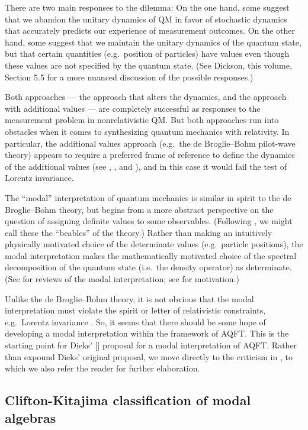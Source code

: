 \documentclass[11pt]{article}
\theoremstyle{definition}
\theoremstyle{definition}
\theoremstyle{remark}
\begin{document}
There are two main responses to the dilemma: On the one hand, some
suggest that we abandon the unitary dynamics of QM in favor of
stochastic dynamics that accurately predicts our experience of
measurement outcomes.  On the other hand, some suggest that we
maintain the unitary dynamics of the quantum state, but that certain
quantities (e.g.\ position of particles) have values even though these
values are not specified by the quantum state.  (See Dickson, this
volume, Section 5.5 for a more nuanced discussion of the possible
responses.)

Both approaches --- the approach that alters the dynamics, and the
approach with additional values --- are completely successful as
responses to the measurement problem in nonrelativistic QM.  But both
approaches run into obstacles when it comes to synthesizing quantum
mechanics with relativity.  In particular, the additional values
approach (e.g.\ the de Broglie--Bohm pilot-wave theory) appears to
require a preferred frame of reference to define the dynamics of the
additional values (see \cite[pp.\ 188--191, 196--198]{cush},
\cite{holland}, and \cite[Chaps.\ 11 \& 12]{hiley}), and in this case
it would fail the test of Lorentz invariance.

The ``modal'' interpretation of quantum mechanics is
similar in spirit to the de Broglie--Bohm theory, but
begins from a more abstract perspective on the question
of assigning definite values to some observables.
(Following \cite{jbell}, we might call these the
``beables'' of the theory.)  Rather than making an
intuitively physically motivated choice of the
determinate values (e.g.\ particle positions), the
modal interpretation makes the mathematically motivated
choice of the spectral decomposition of the quantum
state (i.e.\ the density operator) as determinate.
(See \cite{ver,piet} for reviews of the modal
interpretation; see \cite{rob-kd} for motivation.)

Unlike the de Broglie--Bohm theory, it is not obvious
that the modal interpretation must violate the spirit
or letter of relativistic constraints, e.g.\ Lorentz
invariance \cite[p.\ 9]{dic}.  So, it seems that there
should be some hope of developing a modal
interpretation within the framework of AQFT.  This is
the starting point for Dieks' [\citeyear{diek}]
proposal for a modal interpretation of AQFT.  Rather
than expound Dieks' original proposal, we move directly
to the criticism in \cite{cli9}, to which we also refer
the reader for further elaboration.

\subsection{Clifton-Kitajima classification of modal algebras}
\end{document}
